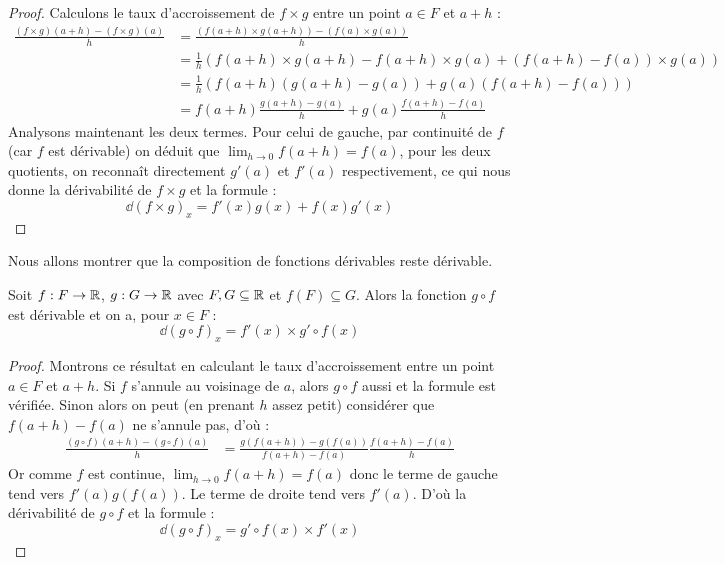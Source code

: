 \begin{proof}
    Calculons le taux d'accroissement de $f\times g$ entre un point $a\in F$ et $a+h$ :
    \begin{align*}
        \displaystyle{\frac{(f\times g)(a+h)-(f\times g)(a)}{h}} &= \displaystyle{\frac{(f(a+h)\times g(a+h))-(f(a)\times g(a))}{h}}\\
        &= \displaystyle{\frac{1}{h}}(f(a+h)\times g(a+h) - f(a+h)\times g(a) + (f(a+h) - f(a))\times g(a))\\
        &= \displaystyle{\frac{1}{h}}(f(a+h)(g(a+h)-g(a)) + g(a)(f(a+h)-f(a)))\\
        &= f(a+h)\displaystyle{\frac{g(a+h)-g(a)}{h}} + g(a)\displaystyle{\frac{f(a+h)-f(a)}{h}}
    \end{align*}
    Analysons maintenant les deux termes. Pour celui de gauche, par continuité de $f$ (car $f$ est dérivable) on déduit que $\displaystyle\lim_{h\to 0}f(a+h) = f(a)$, pour les deux quotients, on reconnaît directement $g'(a)$ et $f'(a)$ respectivement, ce qui nous donne la dérivabilité de $f\times g$ et la formule : $$\boxed{\dd(f\times g)_x = f'(x)g(x)+f(x)g'(x)}$$
\end{proof}

Nous allons montrer que la composition de fonctions dérivables reste dérivable.

\begin{prop}
    Soit $f : F\to \mathbb{R}$, $g : G \to \mathbb{R}$ avec $F,G\subseteq\mathbb{R}$ et $f(F)\subseteq G$. Alors la fonction $g\circ f$ est dérivable et on a, pour $x\in F$ : $$\dd (g\circ f)_x = f'(x)\times g'\circ f(x)$$
\end{prop}

\begin{proof}
    Montrons ce résultat en calculant le taux d'accroissement entre un point $a\in F$ et $a+h$. Si $f$ s'annule au voisinage de $a$, alors $g\circ f$ aussi et la formule est vérifiée. Sinon alors on peut (en prenant $h$ assez petit) considérer que $f(a+h)-f(a)$ ne s'annule pas, d'où :
    \begin{align*}
        \displaystyle\frac{(g\circ f)(a+h) - (g\circ f)(a)}{h} &= \displaystyle\frac{g(f(a+h))-g(f(a))}{f(a+h)-f(a)}\frac{f(a+h)-f(a)}{h}
    \end{align*}
    Or comme $f$ est continue, $\displaystyle\lim_{h\to 0}f(a+h)=f(a)$ donc le terme de gauche tend vers $f'(a)g(f(a))$. Le terme de droite tend vers $f'(a)$. D'où la dérivabilité de $g\circ f$ et la formule : $$\boxed{\dd (g\circ f)_x = g'\circ f(x)\times f'(x)}$$
\end{proof}

